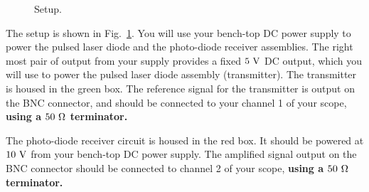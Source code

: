 \begin{figure}[htbp]
\begin{center}
\end{center}
\caption{\label{fig:csetup} Setup.}
\end{figure}

The setup is shown in Fig.~\ref{fig:csetup}.  You will use your
bench-top DC power supply to power the pulsed laser diode and the
photo-diode receiver assemblies.  The right most pair of output from
your supply provides a fixed $5~\rm V$ DC output, which you will use
to power the pulsed laser diode assembly (transmitter).  The
transmitter is housed in the green box. The reference signal for the
transmitter is output on the BNC connector, and should be connected to
your channel 1 of your scope, {\bf using a $50~\rm \Omega$ terminator.}

The photo-diode receiver circuit is housed in the red box.  It should
be powered at $10~\rm V$ from your bench-top DC power supply.  The
amplified signal output on the BNC connector should be connected to
channel 2 of your scope, {\bf using a $50~\rm \Omega$ terminator.}


